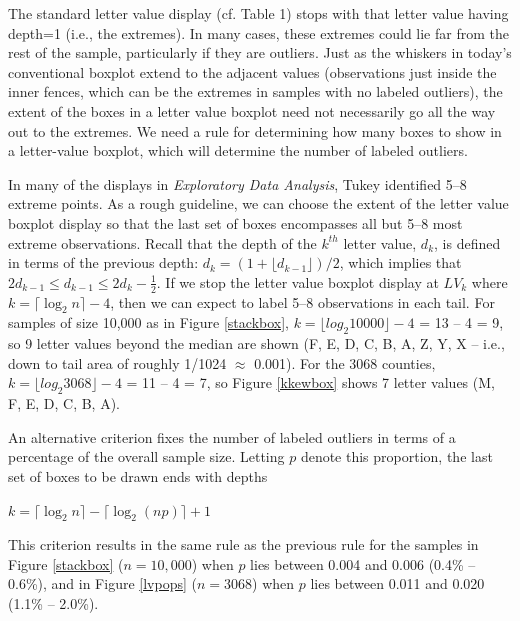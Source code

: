\documentclass[11pt]{article}
\begin{document}
The standard letter value display (cf. Table 1) stops with
that letter value having depth=1 (i.e., the extremes).
In many cases, these extremes could lie far from the
rest of the sample, particularly if they are outliers.
Just as the whiskers in today's conventional boxplot 
extend to the adjacent values (observations just
inside the inner fences, which can be the extremes
in samples with no labeled outliers), the extent
of the boxes in a letter value boxplot need not
necessarily go all the way out to the extremes.
We need a rule for determining how many boxes to
show in a letter-value boxplot, which will determine
the number of labeled outliers.

In many of the displays in \textit{Exploratory
Data Analysis}, Tukey identified 5--8 extreme points.
As a rough guideline, we can choose the extent
of the letter value boxplot display so that
the last set of boxes encompasses all but
5--8 most extreme observations.
Recall that the depth of the $k^{th}$ letter value,
$d_k$, is defined in terms of the previous depth:
$d_k = (1 + \lfloor d_{k-1} \rfloor)/2$, which
implies that 
$2 d_{k-1} \leq d_{k-1} \leq 2 d_k - \frac{1}{2}$.
If we stop the letter value boxplot display at
$LV_k$ where $k = \lceil \log_2 n \rceil - 4$,
then we can expect to label 5--8 observations
in each tail.  For samples of size
10,000 as in Figure \ref{stackbox},
$k = \lfloor log_2 10000 \rfloor - 4$ = 13 -- 4 = 9,
so 9 letter values beyond the median are shown
(F, E, D, C, B, A, Z, Y, X -- i.e., down to
tail area of roughly 1/1024 $\approx$ 0.001).
For the 3068 counties, 
$k = \lfloor log_2 3068 \rfloor - 4$ = 11 -- 4 = 7,
so Figure \ref{kkewbox} shows
7 letter values (M, F, E, D, C, B, A).


An alternative criterion fixes the number of
labeled outliers in terms of a percentage of
the overall sample size.  Letting $p$ denote
this proportion, the last set of boxes to be
drawn ends with depths
\begin{center}
$k = \lceil \log_2 n \rceil - \lceil \log_2 (np) \rceil + 1$
\end{center}
This criterion results in the same rule 
as the previous rule for the samples in
Figure \ref{stackbox} ($n = 10,000$) when 
$p$ lies between 0.004 and 0.006 (0.4\% -- 0.6\%), 
and in Figure \ref{lvpops} ($n = 3068$) when
$p$ lies between 0.011 and 0.020 (1.1\% -- 2.0\%).
\end{document}
